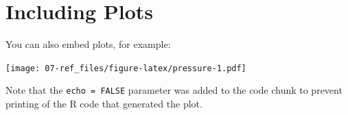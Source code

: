 \documentclass[
]{book}
\begin{document}
\hypertarget{including-plots}{%
\section{Including Plots}\label{including-plots}}

You can also embed plots, for example:

\texttt{[image: 07-ref\_files/figure-latex/pressure-1.pdf]}

Note that the \texttt{echo\ =\ FALSE} parameter was added to the code chunk to prevent printing of the R code that generated the plot.

  
\end{document}
